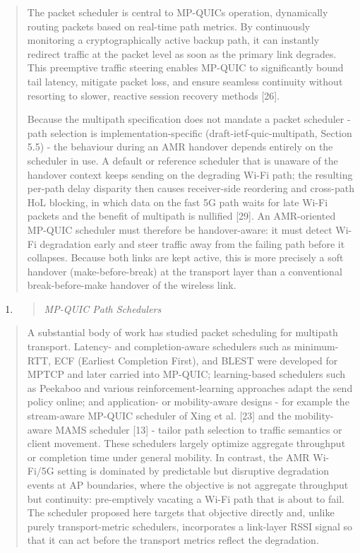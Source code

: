 \begin{quote}
The packet scheduler is central to MP-QUIC\textquotesingle s operation, dynamically routing packets based on real-time path metrics. By continuously monitoring a cryptographically active backup path, it can instantly redirect traffic at the packet level as soon as the primary link degrades. This preemptive traffic steering enables MP-QUIC to significantly bound tail latency, mitigate packet loss, and ensure seamless continuity without resorting to slower, reactive session recovery methods {[}26{]}.

Because the multipath specification does not mandate a packet scheduler - path selection is implementation-specific (draft-ietf-quic-multipath, Section 5.5) - the behaviour during an AMR handover depends entirely on the scheduler in use. A default or reference scheduler that is unaware of the handover context keeps sending on the degrading Wi-Fi path; the resulting per-path delay disparity then causes receiver-side reordering and cross-path HoL blocking, in which data on the fast 5G path waits for late Wi-Fi packets and the benefit of multipath is nullified {[}29{]}. An AMR-oriented MP-QUIC scheduler must therefore be handover-aware: it must detect Wi-Fi degradation early and steer traffic away from the failing path before it collapses. Because both links are kept active, this is more precisely a soft handover (make-before-break) at the transport layer than a conventional break-before-make handover of the wireless link.
\end{quote}

\begin{enumerate}
\def\labelenumi{\arabic{enumi}.}
\setcounter{enumi}{2}
\item
  \begin{quote}
  \emph{MP-QUIC Path Schedulers}
  \end{quote}
\end{enumerate}

\begin{quote}
A substantial body of work has studied packet scheduling for multipath transport. Latency- and completion-aware schedulers such as minimum-RTT, ECF (Earliest Completion First), and BLEST were developed for MPTCP and later carried into MP-QUIC; learning-based schedulers such as Peekaboo and various reinforcement-learning approaches adapt the send policy online; and application- or mobility-aware designs - for example the stream-aware MP-QUIC scheduler of Xing et al. {[}23{]} and the mobility-aware MAMS scheduler {[}13{]} - tailor path selection to traffic semantics or client movement. These schedulers largely optimize aggregate throughput or completion time under general mobility. In contrast, the AMR Wi-Fi/5G setting is dominated by predictable but disruptive degradation events at AP boundaries, where the objective is not aggregate throughput but continuity: pre-emptively vacating a Wi-Fi path that is about to fail. The scheduler proposed here targets that objective directly and, unlike purely transport-metric schedulers, incorporates a link-layer RSSI signal so that it can act before the transport metrics reflect the degradation.
\end{quote}

